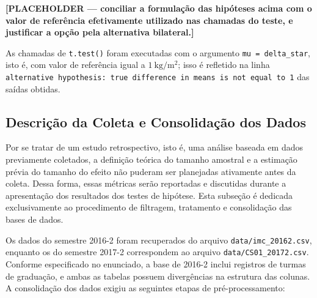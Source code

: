 \documentclass[
]{article}
\begin{document}
\textbf{{[}PLACEHOLDER --- conciliar a formulação das hipóteses acima com o valor de referência
efetivamente utilizado nas chamadas do teste, e justificar a opção pela alternativa
bilateral.{]}}

As chamadas de \texttt{t.test()} foram executadas com o argumento \texttt{mu\ =\ delta\_star}, isto é, com
valor de referência igual a \(1\ \mathrm{kg/m^2}\); isso é refletido na linha
\texttt{alternative\ hypothesis:\ true\ difference\ in\ means\ is\ not\ equal\ to\ 1} das saídas obtidas.

\subsection{Descrição da Coleta e Consolidação dos Dados}\label{descriuxe7uxe3o-da-coleta-e-consolidauxe7uxe3o-dos-dados}

Por se tratar de um estudo retrospectivo, isto é, uma análise baseada em dados previamente coletados, a definição teórica do tamanho amostral e a estimação prévia do tamanho do efeito não puderam ser planejadas ativamente antes da coleta. Dessa forma, essas métricas serão reportadas e discutidas durante a apresentação dos resultados dos testes de hipótese. Esta subseção é dedicada exclusivamente ao procedimento de filtragem, tratamento e consolidação das bases de dados.

Os dados do semestre 2016-2 foram recuperados do arquivo \texttt{data/imc\_20162.csv}, enquanto os do semestre 2017-2 correspondem ao arquivo \texttt{data/CS01\_20172.csv}. Conforme especificado no enunciado, a base de 2016-2 inclui registros de turmas de graduação, e ambas as tabelas possuem divergências na estrutura das colunas. A consolidação dos dados exigiu as seguintes etapas de pré-processamento:
\end{document}
